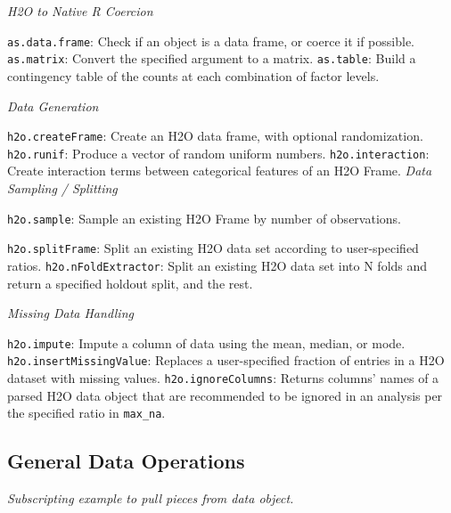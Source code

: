 \documentclass[11pt]{article}
\begin{document}
{\emph{H2O to Native R Coercion}\par
{\texttt{as.data.frame}}: Check if an object is a data frame, or coerce it if possible.\newline
{\texttt{as.matrix}}: Convert the specified argument to a matrix.\newline
 {\texttt{as.table}}: Build a contingency table of the counts at each combination of factor levels.\newline

\emph{Data Generation}\par
{\texttt{h2o.createFrame}}: Create an H2O data frame, with optional randomization.\newline
{\texttt{h2o.runif}}: Produce a vector of random uniform numbers.\newline
{\texttt{h2o.interaction}}: Create interaction terms between categorical features of an H2O Frame.\newline
\newpage
\emph{Data Sampling / Splitting}\par
 {\texttt{h2o.sample}}: Sample an existing H2O Frame by number of observations.\newline
{\texttt{h2o.splitFrame}: Split an existing H2O data set according to user-specified ratios.\newline
{\texttt{h2o.nFoldExtractor}}: Split an existing H2O data set into N folds and return a specified holdout split, and the rest.\newline

\emph{Missing Data Handling}\par
{\texttt{h2o.impute}}: Impute a column of data using the mean, median, or mode.\newline
{\texttt{h2o.insertMissingValue}}: Replaces a user-specified fraction of entries in a H2O dataset with missing values.\newline
{\texttt{h2o.ignoreColumns}}: Returns columns' names of a parsed H2O data object that are recommended to be ignored in an analysis per the specified ratio in {\texttt{max\_na}}.\newline

\subsection{General Data Operations}

\emph{Subscripting example to pull pieces from data object.} 
}}
\end{document}
